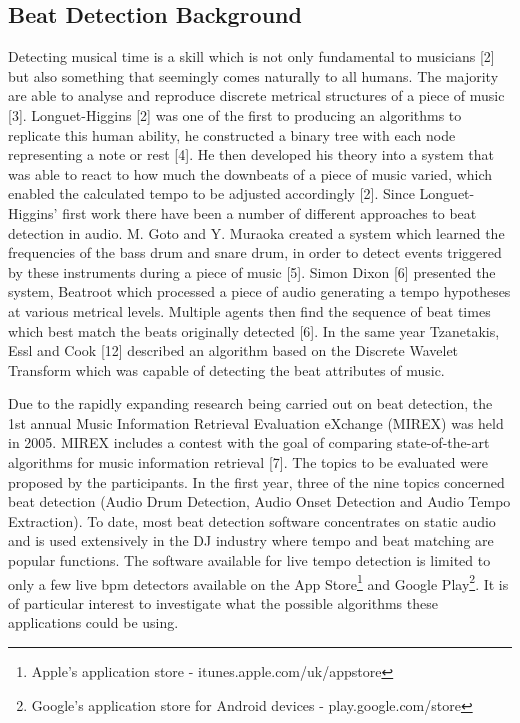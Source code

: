 \documentclass[a4paper, 11pt]{article}
\begin{document}
\subsection{Beat Detection Background}

Detecting musical time is a skill which is not only fundamental to musicians [2] but also something that seemingly comes naturally to all humans. The majority are able to analyse and reproduce discrete metrical structures of a piece of music [3]. Longuet-Higgins [2] was one of the first to producing an algorithms to replicate this human ability, he constructed a binary tree with each node representing a note or rest [4]. He then developed his theory into a system that was able to react to how much the downbeats of a piece of music varied, which enabled the calculated tempo to be adjusted accordingly [2]. Since Longuet-Higgins' first work there have been a number of different approaches to beat detection in audio. M. Goto and Y. Muraoka created a system which learned the frequencies of the bass drum and snare drum, in order to detect events triggered by these instruments during a piece of music [5]. Simon Dixon [6] presented the system, Beatroot which processed a piece of audio generating a tempo hypotheses at various metrical levels. Multiple agents then find the sequence of beat times which best match the beats originally detected [6]. In the same year Tzanetakis, Essl and Cook [12] described an algorithm based on the Discrete Wavelet Transform which was capable of detecting the beat attributes of music. 

Due to the rapidly expanding research being carried out on beat detection, the 1st annual Music Information Retrieval Evaluation eXchange (MIREX) was held in 2005. MIREX includes a contest with the goal of comparing state-of-the-art algorithms for music information retrieval [7]. The topics to be evaluated were proposed by the participants. In the first year, three of the nine topics concerned beat detection (Audio Drum Detection, Audio Onset Detection and Audio Tempo Extraction). To date, most beat detection software concentrates on static audio and is used extensively in the DJ industry where tempo and beat matching are popular functions. The software available for live tempo detection is limited to only a few live bpm detectors available on the App Store\footnote{Apple's application store - itunes.apple.com/uk/appstore‎} and Google Play\footnote{Google's application store for Android devices - play.google.com/store}. It is of particular interest to investigate what the possible algorithms these applications could be using.
\end{document}
